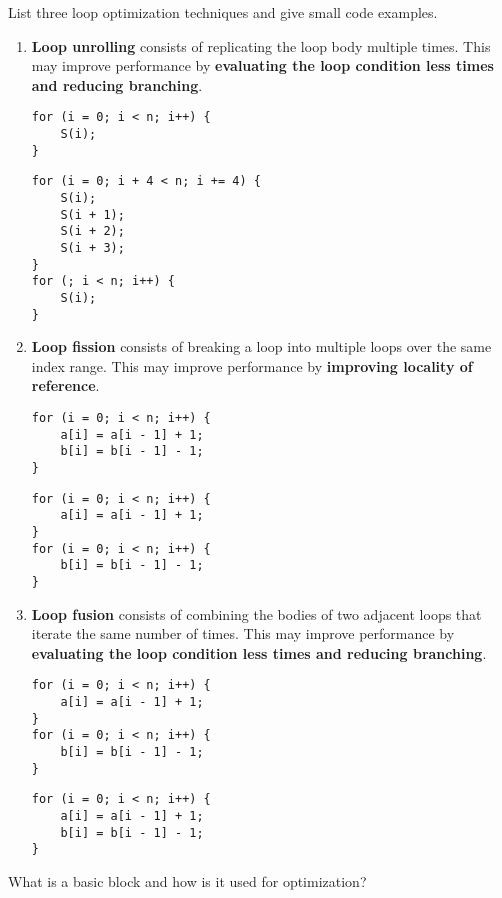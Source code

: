 \begin{Exercise}[difficulty=1]
List three loop optimization techniques and give small code examples.
\end{Exercise}
\begin{Answer}
\begin{enumerate}
\item \textbf{Loop unrolling} consists of replicating the loop body multiple times.
This may improve performance by \textbf{evaluating the loop condition less times and reducing branching}.
\begin{lstlisting}
for (i = 0; i < n; i++) {
    S(i);
}
\end{lstlisting}
\begin{lstlisting}
for (i = 0; i + 4 < n; i += 4) {
    S(i);
    S(i + 1);
    S(i + 2);
    S(i + 3);
}
for (; i < n; i++) {
    S(i);
}
\end{lstlisting}
\item \textbf{Loop fission} consists of breaking a loop into multiple loops over the same index range.
This may improve performance by \textbf{improving locality of reference}.
\begin{lstlisting}
for (i = 0; i < n; i++) {
    a[i] = a[i - 1] + 1;
    b[i] = b[i - 1] - 1;
}
\end{lstlisting}
\begin{lstlisting}
for (i = 0; i < n; i++) {
    a[i] = a[i - 1] + 1;
}
for (i = 0; i < n; i++) {
    b[i] = b[i - 1] - 1;
}
\end{lstlisting}
\item \textbf{Loop fusion} consists of combining the bodies of two adjacent loops that iterate the same number of times.
This may improve performance by \textbf{evaluating the loop condition less times and reducing branching}.
\begin{lstlisting}
for (i = 0; i < n; i++) {
    a[i] = a[i - 1] + 1;
}
for (i = 0; i < n; i++) {
    b[i] = b[i - 1] - 1;
}
\end{lstlisting}
\begin{lstlisting}
for (i = 0; i < n; i++) {
    a[i] = a[i - 1] + 1;
    b[i] = b[i - 1] - 1;
}
\end{lstlisting}
\end{enumerate}
\end{Answer}

\begin{Exercise}[difficulty=1]
What is a basic block and how is it used for optimization?
\end{Exercise}

